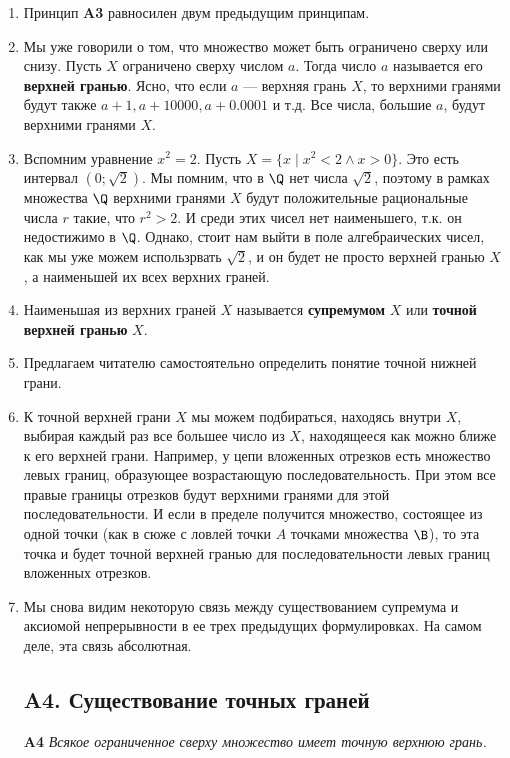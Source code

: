 \begin{enumerate}
\item Принцип \textbf{A3} равносилен двум предыдущим принципам.
\item Мы уже говорили о том, что множество может быть ограничено сверху или снизу. Пусть $X$ ограничено сверху числом $a$. Тогда число $a$ называется его \textbf{верхней гранью}. Ясно, что если $a$ --- верхняя грань $X$, то верхними гранями будут также $a+1, a+10000, a+0.0001$  и т.д. Все числа, большие $a$, будут верхними гранями $X$.
\item Вспомним уравнение $x^2=2$. Пусть $X=\{x\mid x^2<2\land x>0\}$. Это есть интервал $(0;\sqrt 2)$. Мы помним, что в $\Q$ нет числа $\sqrt 2$, поэтому в рамках множества $\Q$ верхними гранями $X$ будут положительные рациональные числа $r$ такие, что $r^2>2$. И среди этих чисел нет наименьшего, т.к. он недостижимо в $\Q$. Однако, стоит нам выйти в поле алгебраических чисел, как мы уже можем использрвать $\sqrt 2$, и он будет не просто верхней гранью $X$, а наименьшей их всех верхних граней.
\item Наименьшая из верхних граней $X$ называется \textbf{супремумом} $X$ или \textbf{точной верхней гранью} $X$.
\item Предлагаем читателю самостоятельно определить понятие точной нижней грани.
\item К точной верхней грани $X$ мы можем подбираться, находясь внутри $X$, выбирая каждый раз все большее число из $X$, находящееся как можно ближе к его верхней грани. Например, у цепи вложенных отрезков есть множество левых границ, образующее возрастающую последовательность. При этом все правые границы отрезков будут верхними гранями для этой последовательности. И если в пределе получится множество, состоящее из одной точки (как в сюже с ловлей точки $A$ точками множества $\B$), то эта точка и будет точной верхней гранью для последовательности левых границ вложенных отрезков.
\item Мы снова видим некоторую связь между существованием супремума и аксиомой непрерывности в ее трех предыдущих формулировках. На самом деле, эта связь абсолютная.

\subsection*{A4. Существование точных граней}

\noindent
{\bf A4} \textit{Всякое ограниченное сверху множество имеет точную верхнюю грань.}


\end{enumerate}
